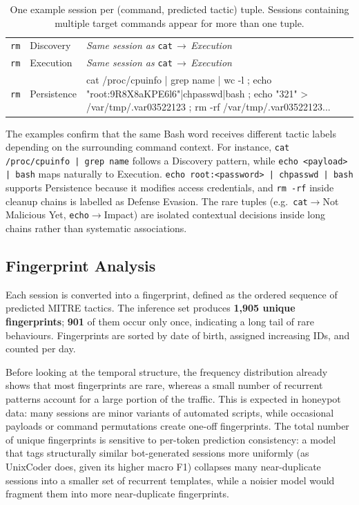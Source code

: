 \begin{table}[H]
\begin{tabular}{@{}llp{9.5cm}@{}}
        \texttt{rm} & Discovery & \textit{Same session as} \texttt{cat}$\,\to\,$\textit{Execution} \\
        \texttt{rm} & Execution & \textit{Same session as} \texttt{cat}$\,\to\,$\textit{Execution} \\
        \texttt{rm} & Persistence & {\ttfamily cat /proc/cpuinfo | grep name | wc -l ; echo "root:9R8X8aKPE6l6"|chpasswd|bash ; echo "321" > /var/tmp/.var03522123 ; rm -rf /var/tmp/.var03522123...} \\
        \bottomrule
    \end{tabular}
    \vspace{0.1cm}
    \caption{One example session per (command, predicted tactic) tuple.
    Sessions containing multiple target commands appear for more than one tuple.}
    \label{tab:task4_examples}
\end{table}

\noindent
The examples confirm that the same Bash word receives different tactic labels
depending on the surrounding command context. For instance,
\texttt{cat /proc/cpuinfo | grep name} follows a Discovery pattern, while
\texttt{echo <payload> | bash} maps naturally to Execution.
\texttt{echo root:<password> | chpasswd | bash} supports Persistence because it
modifies access credentials, and \texttt{rm -rf} inside cleanup chains is
labelled as Defense Evasion. The rare tuples (e.g.\ \texttt{cat}$\to$Not
Malicious Yet, \texttt{echo}$\to$Impact) are isolated contextual decisions
inside long chains rather than systematic associations.

\subsection{Fingerprint Analysis} \label{subsec:task4_fingerprints}

Each session is converted into a fingerprint, defined as the ordered sequence
of predicted MITRE tactics. The inference set produces \textbf{1,905 unique
fingerprints}; \textbf{901} of them occur only once, indicating a long tail of
rare behaviours. Fingerprints are sorted by date of birth, assigned increasing
IDs, and counted per day.

Before looking at the temporal structure, the frequency distribution already
shows that most fingerprints are rare, whereas a small number of recurrent
patterns account for a large portion of the traffic. This is expected in
honeypot data: many sessions are minor variants of automated scripts, while
occasional payloads or command permutations create one-off fingerprints. The
total number of unique fingerprints is sensitive to per-token prediction
consistency: a model that tags structurally similar bot-generated sessions more
uniformly (as UnixCoder does, given its higher macro F1) collapses many
near-duplicate sessions into a smaller set of recurrent templates, while a
noisier model would fragment them into more near-duplicate fingerprints.

